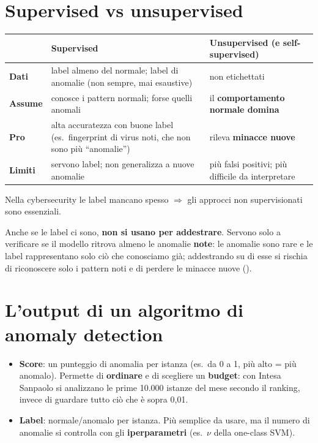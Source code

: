 \section{Supervised vs unsupervised}
\begin{center}
\small
\renewcommand{\arraystretch}{1.2}
\begin{tabularx}{\textwidth}{>{\bfseries}l X X}
\toprule
& Supervised & Unsupervised (e self-supervised)\\
\midrule
Dati & label almeno del normale; label di anomalie (non sempre, mai esaustive) & non etichettati\\
Assume & conosce i pattern normali; forse quelli anomali & il \textbf{comportamento normale domina}\\
Pro & alta accuratezza con buone label (es.\ fingerprint di virus noti, che non sono più ``anomalie'') & rileva \textbf{minacce nuove}\\
Limiti & servono label; non generalizza a nuove anomalie & più falsi positivi; più difficile da interpretare\\
\bottomrule
\end{tabularx}
\end{center}
Nella cybersecurity le label mancano spesso $\Rightarrow$ gli approcci non supervisionati sono essenziali.

\begin{definizione}
Anche se le label ci sono, \textbf{non si usano per addestrare}. Servono solo a verificare se il modello ritrova almeno le anomalie
\textbf{note}: le anomalie sono rare e le label rappresentano solo ciò che conosciamo già; addestrando su di esse si rischia di
riconoscere solo i pattern noti e di perdere le minacce nuove ().
\end{definizione}

\section{L'output di un algoritmo di anomaly detection}
\begin{itemize}
  \item \textbf{Score}: un punteggio di anomalia per istanza (es.\ da 0 a 1, più alto = più anomalo). Permette di \textbf{ordinare} e di scegliere un
        \textbf{budget}: con Intesa Sanpaolo si analizzano le prime 10.000 istanze del mese secondo il ranking, invece di guardare tutto ciò che è
        sopra 0,01.
  \item \textbf{Label}: normale/anomalo per istanza. Più semplice da usare, ma il numero di anomalie si controlla con gli
        \textbf{iperparametri} (es.\ $\nu$ della one-class SVM).
\end{itemize}

